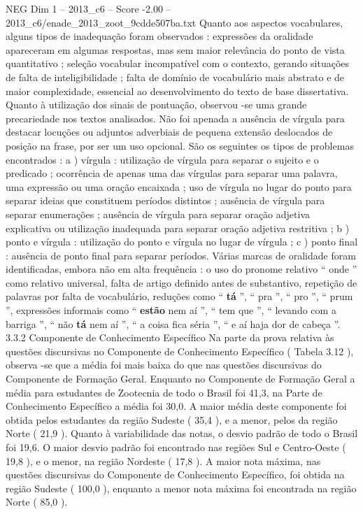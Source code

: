 \begin{textsample}{NEG Dim 1 – 2013\_c6 – Score -2.00 – 2013\_c6/enade\_2013\_zoot\_9cdde507ba.txt}
Quanto aos aspectos vocabulares, alguns tipos de inadequação foram observados : expressões da oralidade apareceram em algumas respostas, mas sem maior relevância do ponto de vista quantitativo ; seleção vocabular incompatível com o contexto, gerando situações de falta de inteligibilidade ; falta de domínio de vocabulário mais abstrato e de maior complexidade, essencial ao desenvolvimento do texto de base dissertativa.
Quanto à utilização dos sinais de pontuação, observou -se uma grande precariedade nos textos analisados.
Não foi apenada a ausência de vírgula para destacar locuções ou adjuntos adverbiais de pequena extensão deslocados de posição na frase, por ser um uso opcional.
São os seguintes os tipos de problemas encontrados : a ) vírgula : utilização de vírgula para separar o sujeito e o predicado ; ocorrência de apenas uma das vírgulas para separar uma palavra, uma expressão ou uma oração encaixada ; uso de vírgula no lugar do ponto para separar ideias que constituem períodos distintos ; ausência de vírgula para separar enumerações ; ausência de vírgula para separar oração adjetiva explicativa ou utilização inadequada para separar oração adjetiva restritiva ; b ) ponto e vírgula : utilização do ponto e vírgula no lugar de vírgula ; c ) ponto final : ausência de ponto final para separar períodos.
Várias marcas de oralidade foram identificadas, embora não em alta frequência : o uso do pronome relativo “ onde ” como relativo universal, falta de artigo definido antes de substantivo, repetição de palavras por falta de vocabulário, reduções como “ \textbf{tá} ”, “ pra ”, “ pro ”, “ prum ”, expressões informais como “ \textbf{estão} nem aí ”, “ tem que ”, “ levando com a barriga ”, “ não \textbf{tá} nem aí ”, “ a coisa fica séria ”, “ e aí haja dor de cabeça ”. 3.3.2 Componente de Conhecimento Específico Na parte da prova relativa às questões discursivas no Componente de Conhecimento Específico ( Tabela 3.12 ), observa -se que a média foi mais baixa do que nas questões discursivas do Componente de Formação Geral.
Enquanto no Componente de Formação Geral a média para estudantes de Zootecnia de todo o Brasil foi 41,3, na Parte de Conhecimento Específico a média foi 30,0.
A maior média deste componente foi obtida pelos estudantes da região Sudeste ( 35,4 ), e a menor, pelos da região Norte ( 21,9 ).
Quanto à variabilidade das notas, o desvio padrão de todo o Brasil foi 19,6.
O maior desvio padrão foi encontrado nas regiões Sul e Centro-Oeste ( 19,8 ), e o menor, na região Nordeste ( 17,8 ).
A maior nota máxima, nas questões discursivas do Componente de Conhecimento Específico, foi obtida na região Sudeste ( 100,0 ), enquanto a menor nota máxima foi encontrada na região Norte ( 85,0 ).

\end{textsample}
